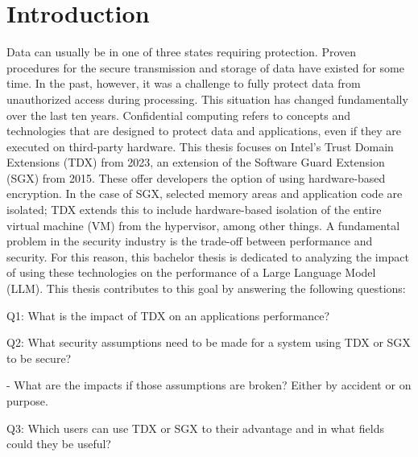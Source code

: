 
\chapter{Introduction}
\label{ch:Introduction}


Data can usually be in one of three states requiring protection. Proven procedures for the secure transmission and storage of data have existed for some time. In the past, however, it was a challenge to fully protect data from unauthorized access during processing. This situation has changed fundamentally over the last ten years. Confidential computing refers to concepts and technologies that are designed to protect data and applications, even if they are executed on third-party hardware. This thesis focuses on Intel's Trust Domain Extensions (TDX) from 2023, an extension of the Software Guard Extension (SGX) from 2015. These offer developers the option of using hardware-based encryption. In the case of SGX, selected memory areas and application code are isolated; TDX extends this to include hardware-based isolation of the entire virtual machine (VM) from the hypervisor, among other things. 
A fundamental problem in the security industry is the trade-off between performance and security. For this reason, this bachelor thesis is dedicated to analyzing the impact of using these technologies on the performance of a Large Language Model (LLM). This thesis contributes to this goal by answering the following questions:

Q1: What is the impact of TDX on an applications performance?

Q2: What security assumptions need to be made for a system using TDX or SGX to be secure?

    - What are the impacts if those assumptions are broken? Either by accident or on purpose.
    
Q3: Which users can use TDX or SGX to their advantage and in what fields could they be useful?


